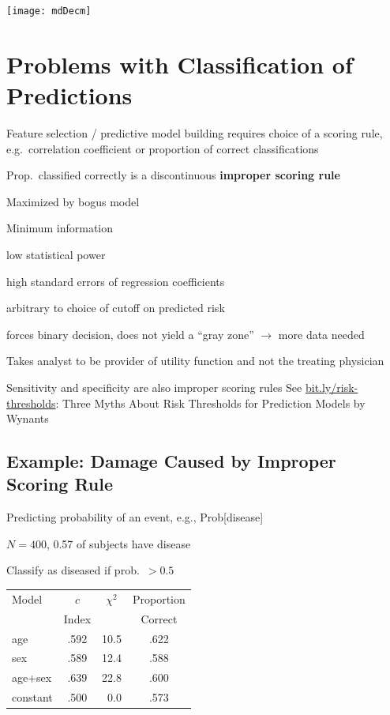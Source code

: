 \centerline{\texttt{[image: mdDecm]}}

\section{Problems with Classification of Predictions}%
\bi
\item Feature selection / predictive model building requires choice of
a scoring rule, e.g.\ correlation coefficient or proportion of correct
classifications
\item Prop.\ classified correctly is a discontinuous \textbf{improper scoring
    rule}
 \bi
 \item Maximized by bogus model 
 \ei
\item Minimum information
 \bi
 \item low statistical power
 \item high standard errors of regression coefficients
 \item arbitrary to choice of cutoff on predicted risk
 \item forces binary decision, does not yield a ``gray zone''
   $\rightarrow$ more data needed
 \ei
\item Takes analyst to be provider of utility function and not the
 treating physician
\item Sensitivity and specificity are also improper scoring rules
\ei
See
\href{https://bmcmedicine.biomedcentral.com/articles/10.1186/s12916-019-1425-3}{bit.ly/risk-thresholds}:
Three Myths About Risk Thresholds for Prediction Models by Wynants~\etal


\subsection{Example: Damage Caused by Improper Scoring Rule}
\bi
\item Predicting probability of an event, e.g., Prob[disease]
\item $N=400$, 0.57 of subjects have disease
\item Classify as diseased if prob.\ $>0.5$
\ei
\begin{center}\begin{tabular}{lccc}\hline
Model & $c$   & $\chi^{2}$ & Proportion \\
      & Index &            & Correct \\ \hline
age     & .592 & 10.5 & .622\\
sex     & .589 & 12.4 & .588\\
age+sex & .639 & 22.8 & .600\\
constant &.500 & ~0.0 & .573\\ \hline
\end{tabular}\end{center}


